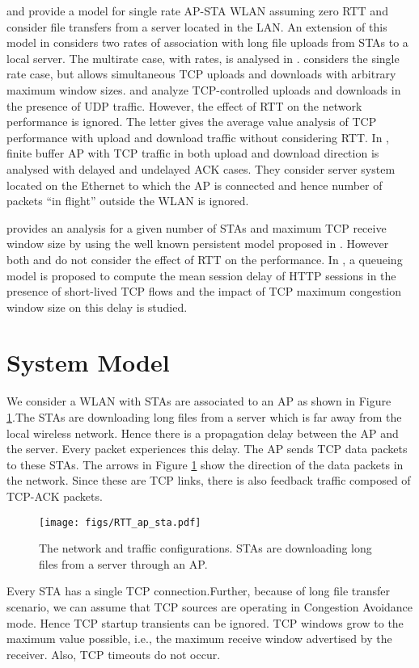 \documentclass[conference]{IEEEtran}
\begin{document}
\cite{astn_model:Kuriakose} and \cite{astn_model:Bruno4} provide a model for
single rate AP-STA WLAN assuming zero RTT and consider file transfers from
a server located in the LAN. An extension of this model in 
\cite{astn_model:Krusheel} considers two rates of association with long 
file uploads from STAs to a local server. The multirate case, with  rates,
is analysed in \cite{astn_model:pradeep_kuri}. \cite{astn_model:pradeep_kuri2}
considers the single rate case, but allows simultaneous TCP uploads and
downloads with arbitrary maximum window sizes. 
\cite{astn_model:Bruno1} and \cite{astn_model:Bruno2} analyze TCP-controlled 
uploads and downloads in the presence of UDP traffic. However, the effect
of RTT on the network performance is ignored. 
The letter \cite{astn_model:Bruno3} gives the average value analysis of TCP 
performance with upload and download traffic without considering RTT.
In \cite{astn_model:Onkar}, finite buffer AP with TCP traffic in both upload and
download direction is analysed with delayed and undelayed ACK cases. They 
consider server system located on the Ethernet to which the AP is connected 
and hence number of packets ``in flight'' outside the WLAN is ignored. 

\cite{astn_model:Yu} provides an analysis for a given number of STAs and maximum
TCP receive window size by using the well known  persistent model proposed
in \cite{astn_model:Cali}. However both \cite{astn_model:Yu} and 
\cite{astn_model:Cali} do not consider the effect of RTT on the performance.
In \cite{astn_model:Miorandi}, a queueing model is proposed to compute the mean
session delay of HTTP sessions in the presence of short-lived TCP flows and 
the impact of TCP maximum congestion window size on this delay is studied.
\section{System Model}\label{sec:System_Model}
We consider a WLAN with  STAs are associated to an AP as shown
in Figure \ref{fig:AP_STAs}.The STAs are downloading long files from a server
which is far away from the local wireless network. Hence there is a propagation
delay between the AP and the
server. Every packet experiences this delay. The AP sends TCP data packets to
these STAs. The arrows in Figure \ref{fig:AP_STAs} show the direction of
the data packets in the network. Since these are TCP links, there is also
feedback traffic composed of TCP-ACK packets.
 
\begin{figure}[ht]
\centering
\texttt{[image: figs/RTT\_ap\_sta.pdf]} 
\caption{The network and traffic configurations. STAs are downloading 
long files from a server through an AP.}
\label{fig:AP_STAs}
\end{figure}
 Every STA has a single TCP connection.Further, because of long file 
transfer scenario, we can assume that TCP
sources are operating in Congestion Avoidance mode. Hence TCP startup
transients can be ignored. TCP windows grow to the maximum value possible, 
i.e., the maximum receive window advertised by the receiver.  Also, TCP 
timeouts do not occur.
\end{document}
